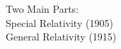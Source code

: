 \documentclass[preview]{standalone}
\begin{document}
\begin{center}
Two Main Parts:\\Special Relativity (1905)\\General Relativity (1915)
\end{center}
\end{document}
